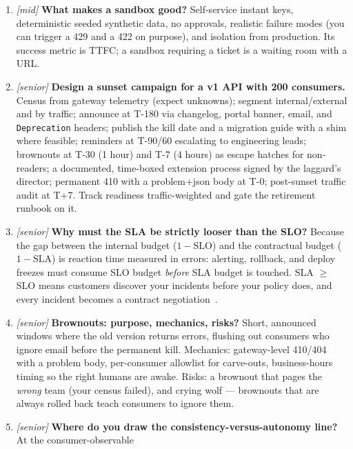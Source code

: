 \begin{enumerate}[label=\textbf{Q\arabic*.}, leftmargin=1.7cm]
        teaches consumers to distrust every other signal you send.
  \item \emph{[mid]} \textbf{What makes a sandbox good?} Self-service
        instant keys, deterministic seeded synthetic data, no approvals,
        realistic failure modes (you can trigger a 429 and a 422 on
        purpose), and isolation from production. Its success metric is
        TTFC; a sandbox requiring a ticket is a waiting room with a URL.
  \item \emph{[senior]} \textbf{Design a sunset campaign for a v1 API
        with 200 consumers.} Census from gateway telemetry (expect
        unknowns); segment internal/external and by traffic; announce at
        T-180 via changelog, portal banner, email, and
        \texttt{Deprecation} headers; publish the kill date and a
        migration guide with a shim where feasible; reminders at T-90/60
        escalating to engineering leads; brownouts at T-30 (1 hour) and
        T-7 (4 hours) as escape hatches for non-readers; a documented,
        time-boxed extension process signed by the laggard's director;
        permanent 410 with a problem+json body at T-0; post-sunset
        traffic audit at T+7. Track readiness traffic-weighted and gate
        the retirement runbook on it.
  \item \emph{[senior]} \textbf{Why must the SLA be strictly looser than
        the SLO?} Because the gap between the internal budget
        ($1-\text{SLO}$) and the contractual budget ($1-\text{SLA}$) is
        reaction time measured in errors: alerting, rollback, and deploy
        freezes must consume SLO budget \emph{before} SLA budget is
        touched. SLA $\geq$ SLO means customers discover your incidents
        before your policy does, and every incident becomes a contract
        negotiation~\cite{beyer2016sre}.
  \item \emph{[senior]} \textbf{Brownouts: purpose, mechanics, risks?}
        Short, announced windows where the old version returns errors,
        flushing out consumers who ignore email before the permanent
        kill. Mechanics: gateway-level 410/404 with a problem body,
        per-consumer allowlist for carve-outs, business-hours timing so
        the right humans are awake. Risks: a brownout that pages the
        \emph{wrong} team (your census failed), and crying wolf ---
        brownouts that are always rolled back teach consumers to ignore
        them.
  \item \emph{[senior]} \textbf{Where do you draw the
        consistency-versus-autonomy line?} At the consumer-observable

\end{enumerate}
